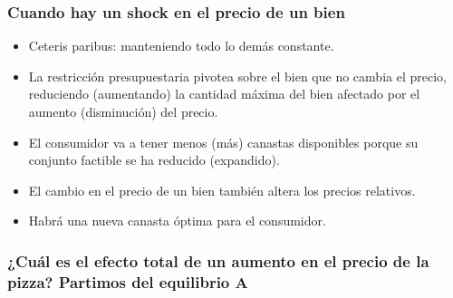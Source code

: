 \documentclass{beamer}
\begin{document}
\begin{frame}
\frametitle{Cuando hay un shock en el precio de un bien}
\begin{itemize}
    \item Ceteris paribus: manteniendo todo lo demás constante.
    \item La restricción presupuestaria pivotea sobre el bien que no cambia el precio, reduciendo (aumentando) la cantidad máxima del bien afectado por el aumento (disminución) del precio.  
    \item El consumidor va a tener menos (más) canastas disponibles porque su conjunto factible se ha reducido (expandido).
    \item El cambio en el precio de un bien también altera los precios relativos. 
    \item Habrá una nueva canasta óptima para el consumidor.
\end{itemize}
\end{frame}

\begin{frame}
\frametitle{¿Cuál es el efecto total de un aumento en el precio de la pizza? Partimos del equilibrio A}
\begin{center}
\begin{figure}[H]
\renewcommand{\figurename}{Figure}
\begin{center}
\end{center}
\end{figure}
\end{center}
\end{frame}
\end{document}
